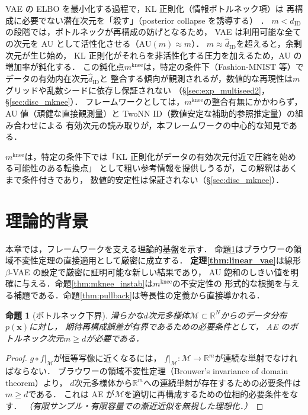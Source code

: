 \documentclass[11pt,a4paper]{jsarticle}
\newtheorem{proposition}{命題}
\newcommand{\R}{\mathbb{R}}
\newcommand{\mknee}{m^{\mathrm{knee}}}
\begin{document}
VAE の ELBO を最小化する過程で，KL 正則化（情報ボトルネック項）は
再構成に必要でない潜在次元を「殺す」（posterior collapse を誘導する）
\cite{lucas2019elbo,higgins2017betavae}．
$m < \hat{d}_\mathrm{ID}$の段階では，ボトルネックが再構成の妨げとなるため，
VAE は利用可能な全ての次元を AU として活性化させる（$\mathrm{AU}(m) \approx m$）．
$m \approx \hat{d}_\mathrm{ID}$を超えると，余剰次元が生じ始め，
KL 正則化がそれらを非活性化する圧力を加えるため，AU の増加率が鈍化する．
この鈍化点$\mknee$は，特定の条件下（Fashion-MNIST 等）でデータの有効内在次元$\hat{d}_\mathrm{ID}$と
整合する傾向が観測されるが，数値的な再現性は$m$グリッドや乱数シードに依存し保証されない
（§\ref{sec:exp_multiseed2}，§\ref{sec:disc_mknee}）．
フレームワークとしては，$\mknee$の整合有無にかかわらず，
AU 値（頑健な直接観測量）と TwoNN ID（数値安定な補助的参照推定量）の組み合わせによる
有効次元の読み取りが，本フレームワークの中心的な知見である．

$\mknee$は，特定の条件下では「KL 正則化がデータの有効次元付近で圧縮を始める可能性のある転換点」
として粗い参考情報を提供しうるが，この解釈はあくまで条件付きであり，
数値的安定性は保証されない（§\ref{sec:disc_mknee}）．

\section{理論的背景}\label{sec:theory}

本章では，フレームワークを支える理論的基盤を示す．
命題\ref{thm:lower_bound}はブラウワーの領域不変性定理の直接適用として厳密に成立する．
\textbf{定理\ref{thm:linear_vae}}は線形$\beta$-VAE の設定で厳密に証明可能な新しい結果であり，
AU 飽和のしきい値を明確に与える．命題\ref{thm:mknee_instab}は$\mknee$の不安定性の
形式的な根拠を与える補題である．命題\ref{thm:pullback}は等長性の定義から直接導かれる．

\begin{proposition}[ボトルネック下界]\label{thm:lower_bound}
滑らかな$d$次元多様体$\mathcal{M} \subset \R^N$からのデータ分布$p(\boldsymbol{x})$に対し，
期待再構成誤差が有界であるための必要条件として，
AE のボトルネック次元$m \geq d$が必要である．
\end{proposition}

\begin{proof}
$g \circ f|_\mathcal{M}$が恒等写像に近くなるには，
$f|_\mathcal{M}: \mathcal{M} \to \R^m$が連続な単射でなければならない．
ブラウワーの領域不変性定理（Brouwer's invariance of domain theorem）\cite{hatcher2002algebraic}より，
$d$次元多様体から$\R^m$への連続単射が存在するための必要条件は$m \geq d$である．
これは AE が$\mathcal{M}$を適切に再構成するための位相的必要条件をなす．
\textit{（有限サンプル・有限容量での漸近近似を無視した理想化．）}
\end{proof}
\end{document}
